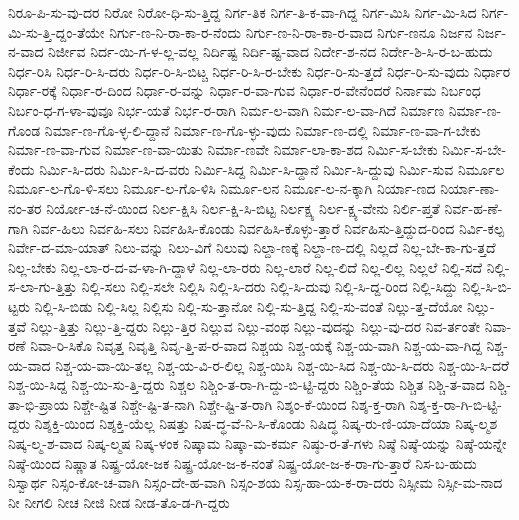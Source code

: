 {ನಿರೂ-ಪಿ-ಸು-ವು-ದರ
ನಿರೋ
ನಿರೋ-ಧಿ-ಸು-ತ್ತಿದ್ದ
ನಿರ್ಗ-ತಿಕ
ನಿರ್ಗ-ತಿ-ಕ-ವಾ-ಗಿದ್ದ
ನಿರ್ಗ-ಮಿಸಿ
ನಿರ್ಗ-ಮಿ-ಸಿದ
ನಿರ್ಗ-ಮಿ-ಸು-ತ್ತಿ-ದ್ದಂ-ತೆಯೇ
ನಿರ್ಗು-ಣ-ನಿ-ರಾ-ಕಾ-ರ-ನೆಂದು
ನಿರ್ಗು-ಣ-ನಿ-ರಾ-ಕಾ-ರ-ವಾದ
ನಿರ್ಗು-ಣನೂ
ನಿರ್ಜನ
ನಿರ್ಜ-ನ-ವಾದ
ನಿರ್ಜೀವ
ನಿರ್ದ-ಯಿ-ಗ-ಳ-ಲ್ಲ-ವಲ್ಲ
ನಿರ್ದಿಷ್ಟ
ನಿರ್ದಿ-ಷ್ಟ-ವಾದ
ನಿರ್ದೇ-ಶ-ನದ
ನಿರ್ದೇ-ಶಿ-ಸಿ-ರ-ಬ-ಹುದು
ನಿರ್ಧ-ರಿಸಿ
ನಿರ್ಧ-ರಿ-ಸಿ-ದರು
ನಿರ್ಧ-ರಿ-ಸಿ-ಬಿಟ್ಚ
ನಿರ್ಧ-ರಿ-ಸಿ-ರ-ಬೇಕು
ನಿರ್ಧ-ರಿ-ಸು-ತ್ತದೆ
ನಿರ್ಧ-ರಿ-ಸು-ವುದು
ನಿರ್ಧಾರ
ನಿರ್ಧಾ-ರಕ್ಕೆ
ನಿರ್ಧಾ-ರ-ದಿಂದ
ನಿರ್ಧಾ-ರ-ವನ್ನು
ನಿರ್ಧಾ-ರ-ವಾ-ಗುವ
ನಿರ್ಧಾ-ರ-ವೇನೆಂದರೆ
ನಿರ್ನಾಮ
ನಿರ್ಬಂಧ
ನಿರ್ಬಂ-ಧ-ಗ-ಳಾ-ವುವೂ
ನಿರ್ಭ-ಯತೆ
ನಿರ್ಭ-ರ-ರಾಗಿ
ನಿರ್ಮ-ಲ-ವಾಗಿ
ನಿರ್ಮ-ಲ-ವಾ-ಗಿದೆ
ನಿರ್ಮಾಣ
ನಿರ್ಮಾ-ಣ-ಗೊಂಡ
ನಿರ್ಮಾ-ಣ-ಗೊ-ಳ್ಳ-ಲಿ-ದ್ದಾನೆ
ನಿರ್ಮಾ-ಣ-ಗೊ-ಳ್ಳು-ವುದು
ನಿರ್ಮಾ-ಣ-ದಲ್ಲಿ
ನಿರ್ಮಾ-ಣ-ವಾ-ಗ-ಬೇಕು
ನಿರ್ಮಾ-ಣ-ವಾ-ಗುವ
ನಿರ್ಮಾ-ಣ-ವಾ-ಯಿತು
ನಿರ್ಮಾ-ಣವೇ
ನಿರ್ಮಾ-ಲಾ-ಕಾ-ಶದ
ನಿರ್ಮಿ-ಸ-ಬೇಕು
ನಿರ್ಮಿ-ಸ-ಬೇ-ಕೆಂದು
ನಿರ್ಮಿ-ಸಿ-ದರು
ನಿರ್ಮಿ-ಸಿ-ದ-ವರು
ನಿರ್ಮಿ-ಸಿದ್ದ
ನಿರ್ಮಿ-ಸಿ-ದ್ದಾನೆ
ನಿರ್ಮಿ-ಸಿ-ದ್ದುವು
ನಿರ್ಮಿ-ಸುವ
ನಿರ್ಮೂಲ
ನಿರ್ಮೂ-ಲ-ಗೊ-ಳಿ-ಸಲು
ನಿರ್ಮೂ-ಲ-ಗೊ-ಳಿಸಿ
ನಿರ್ಮೂ-ಲನ
ನಿರ್ಮೂ-ಲ-ನ-ಕ್ಕಾಗಿ
ನಿರ್ಯಾ-ಣದ
ನಿರ್ಯಾ-ಣಾ-ನಂ-ತರ
ನಿರ್ಯೋ-ಚ-ನೆ-ಯಿಂದ
ನಿರ್ಲ-ಕ್ಷಿಸಿ
ನಿರ್ಲ-ಕ್ಷಿ-ಸಿ-ಬಿಟ್ಟ
ನಿರ್ಲಕ್ಷ್ಯ
ನಿರ್ಲ-ಕ್ಷ್ಯ-ವೇನು
ನಿರ್ಲಿ-ಪ್ತತೆ
ನಿರ್ವ-ಹ-ಣೆ-ಗಾಗಿ
ನಿರ್ವ-ಹಿಲು
ನಿರ್ವಹಿ-ಸಲು
ನಿರ್ವಹಿಸಿ-ಕೊಂಡು
ನಿರ್ವಹಿಸಿ-ಕೊಳ್ಳು-ತ್ತಾರೆ
ನಿರ್ವಹಿಸು-ತ್ತಿದ್ದುದ-ರಿಂದ
ನಿರ್ವಿ-ಕಲ್ಪ
ನಿರ್ವೇ-ದ-ಮಾ-ಯಾತ್
ನಿಲು-ವನ್ನು
ನಿಲು-ವಿಗೆ
ನಿಲುವು
ನಿಲ್ದಾ-ಣಕ್ಕೆ
ನಿಲ್ದಾ-ಣ-ದಲ್ಲಿ
ನಿಲ್ಲದೆ
ನಿಲ್ಲ-ಬೇ-ಕಾ-ಗು-ತ್ತದೆ
ನಿಲ್ಲ-ಬೇಕು
ನಿಲ್ಲ-ಲಾ-ರ-ದ-ವ-ಳಾ-ಗಿ-ದ್ದಾಳೆ
ನಿಲ್ಲ-ಲಾ-ರರು
ನಿಲ್ಲ-ಲಾರೆ
ನಿಲ್ಲ-ಲಿದೆ
ನಿಲ್ಲ-ಲಿಲ್ಲ
ನಿಲ್ಲಲೆ
ನಿಲ್ಲಿ-ಸದೆ
ನಿಲ್ಲಿ-ಸ-ಲಾ-ಗು-ತ್ತಿತ್ತು
ನಿಲ್ಲಿ-ಸಲು
ನಿಲ್ಲಿ-ಸಲೇ
ನಿಲ್ಲಿಸಿ
ನಿಲ್ಲಿ-ಸಿ-ದರು
ನಿಲ್ಲಿ-ಸಿ-ದುವು
ನಿಲ್ಲಿ-ಸಿ-ದ್ದ-ರಿಂದ
ನಿಲ್ಲಿ-ಸಿದ್ದು
ನಿಲ್ಲಿ-ಸಿ-ಬಿ-ಟ್ಟರು
ನಿಲ್ಲಿ-ಸಿ-ಬಿಡು
ನಿಲ್ಲಿ-ಸಿಲ್ಲ
ನಿಲ್ಲಿಸು
ನಿಲ್ಲಿ-ಸು-ತ್ತಾನೋ
ನಿಲ್ಲಿ-ಸು-ತ್ತಿದ್ದ
ನಿಲ್ಲಿ-ಸು-ವಂತೆ
ನಿಲ್ಲು-ತ್ತ-ದೆಯೋ
ನಿಲ್ಲು-ತ್ತವೆ
ನಿಲ್ಲು-ತ್ತಿತ್ತು
ನಿಲ್ಲು-ತ್ತಿ-ದ್ದರು
ನಿಲ್ಲು-ತ್ತಿರ
ನಿಲ್ಲುವ
ನಿಲ್ಲು-ವಂಥ
ನಿಲ್ಲು-ವುದನ್ನು
ನಿಲ್ಲು-ವು-ದರ
ನಿವ-ರ್ತಂತೇ
ನಿವಾ-ರಣೆ
ನಿವಾ-ರಿ-ಸಿಕೊ
ನಿವೃತ್ತ
ನಿವೃತ್ತಿ
ನಿವೃ-ತ್ತಿ-ಪ-ರ-ವಾದ
ನಿಶ್ಚಯ
ನಿಶ್ಚ-ಯಕ್ಕೆ
ನಿಶ್ಚ-ಯ-ವಾಗಿ
ನಿಶ್ಚ-ಯ-ವಾ-ಗಿದ್ದ
ನಿಶ್ಚ-ಯ-ವಾದ
ನಿಶ್ಚ-ಯ-ವಾ-ಯಿ-ತಲ್ಲ
ನಿಶ್ಚ-ಯ-ವಿ-ರ-ಲಿಲ್ಲ
ನಿಶ್ಚ-ಯಿಸಿ
ನಿಶ್ಚ-ಯಿ-ಸಿದ
ನಿಶ್ಚ-ಯಿ-ಸಿ-ದರು
ನಿಶ್ಚ-ಯಿ-ಸಿ-ದರೆ
ನಿಶ್ಚ-ಯಿ-ಸಿದ್ದ
ನಿಶ್ಚ-ಯಿ-ಸು-ತ್ತಿ-ದ್ದರು
ನಿಶ್ಚಲ
ನಿಶ್ಚಿಂ-ತ-ರಾ-ಗಿ-ದ್ದು-ಬಿ-ಟ್ಟಿ-ದ್ದರು
ನಿಶ್ಚಿಂ-ತೆಯ
ನಿಶ್ಚಿತ
ನಿಶ್ಚಿ-ತ-ವಾದ
ನಿಶ್ಚಿ-ತಾ-ಭಿ-ಪ್ರಾಯ
ನಿಶ್ಚೇ-ಷ್ಟಿತ
ನಿಶ್ಚೇ-ಷ್ಟಿ-ತ-ನಾಗಿ
ನಿಶ್ಚೇ-ಷ್ಟಿ-ತ-ರಾಗಿ
ನಿಶ್ಶಂ-ಕೆ-ಯಿಂದ
ನಿಶ್ಶ-ಕ್ತ-ರಾಗಿ
ನಿಶ್ಶ-ಕ್ತ-ರಾ-ಗಿ-ಬಿ-ಟ್ಟಿ-ದ್ದರು
ನಿಶ್ಶಕ್ತಿ-ಯಿಂದ
ನಿಶ್ಶಕ್ತಿ-ಯೆಲ್ಲ
ನಿಷತ್ತು
ನಿಷ-ದ್ಧ-ವೆ-ನಿ-ಸಿ-ಕೊಂಡು
ನಿಷಿದ್ಧ
ನಿಷ್ಕ-ರು-ಣಿ-ಯಾ-ದೆಯಾ
ನಿಷ್ಕ-ಲ್ಮಶ
ನಿಷ್ಕ-ಲ್ಮ-ಶ-ವಾದ
ನಿಷ್ಕ-ಲ್ಮಷ
ನಿಷ್ಕ-ಳಂಕ
ನಿಷ್ಕಾಮ
ನಿಷ್ಕಾ-ಮ-ಕರ್ಮ
ನಿಷ್ಠು-ರ-ತೆ-ಗಳು
ನಿಷ್ಠೆ
ನಿಷ್ಠೆ-ಯನ್ನು
ನಿಷ್ಠೆ-ಯನ್ನೇ
ನಿಷ್ಠೆ-ಯಿಂದ
ನಿಷ್ಣಾತ
ನಿಷ್ಪ್ರ-ಯೋ-ಜಕ
ನಿಷ್ಪ್ರ-ಯೋ-ಜ-ಕ-ನಂತೆ
ನಿಷ್ಪ್ರ-ಯೋ-ಜ-ಕ-ರಾ-ಗು-ತ್ತಾರೆ
ನಿಸ-ಬ-ಹುದು
ನಿಸ್ವಾರ್ಥ
ನಿಸ್ಸಂ-ಕೋ-ಚ-ವಾಗಿ
ನಿಸ್ಸಂ-ದೇ-ಹ-ವಾಗಿ
ನಿಸ್ಸಂ-ಶಯ
ನಿಸ್ಸ-ಹಾ-ಯ-ಕ-ರಾ-ದರು
ನಿಸ್ಸೀಮ
ನಿಸ್ಸೀ-ಮ-ನಾದ
ನೀ
ನೀಗಲಿ
ನೀಚ
ನೀಜಿ
ನೀಡ
ನೀಡ-ತೊ-ಡ-ಗಿ-ದ್ದರು
}
